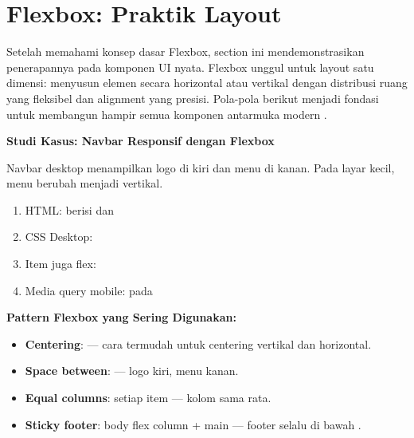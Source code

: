 \section{Flexbox: Praktik Layout}

Setelah memahami konsep dasar Flexbox, section ini mendemonstrasikan penerapannya pada komponen UI nyata. Flexbox unggul untuk layout satu dimensi: menyusun elemen secara horizontal atau vertikal dengan distribusi ruang yang fleksibel dan alignment yang presisi. Pola-pola berikut menjadi fondasi untuk membangun hampir semua komponen antarmuka modern \cite{mdnCss}.

\begin{contoh}
\textbf{Studi Kasus: Navbar Responsif dengan Flexbox}

Navbar desktop menampilkan logo di kiri dan menu di kanan. Pada layar kecil, menu berubah menjadi vertikal.
\begin{enumerate}
  \item HTML:  berisi  dan 
  \item CSS Desktop: 
  \item Item  juga flex: 
  \item Media query mobile:  pada 
\end{enumerate}
\end{contoh}


\begin{konsep}
\textbf{Pattern Flexbox yang Sering Digunakan:}
\begin{itemize}
  \item \textbf{Centering}:  --- cara termudah untuk centering vertikal dan horizontal.
  \item \textbf{Space between}:  --- logo kiri, menu kanan.
  \item \textbf{Equal columns}: setiap item  --- kolom sama rata.
  \item \textbf{Sticky footer}: body flex column + main  --- footer selalu di bawah \cite{cssTricks}.
\end{itemize}
\end{konsep}

